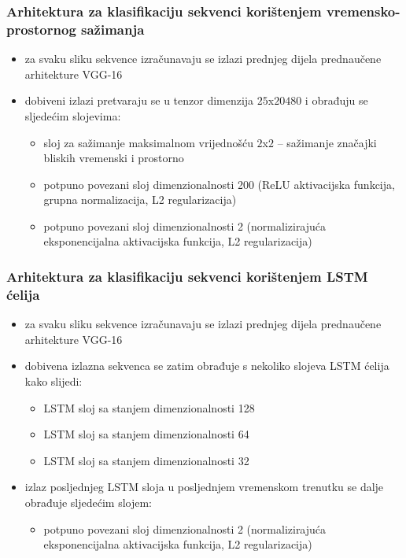 \documentclass{beamer}
\begin{document}
\begin{frame}
\frametitle{Arhitektura za klasifikaciju sekvenci korištenjem vremensko-prostornog sažimanja}
 \begin{itemize}
  \item za svaku sliku sekvence izračunavaju se izlazi prednjeg dijela prednaučene arhitekture VGG-16
  \item dobiveni izlazi pretvaraju se u tenzor dimenzija $25$x$20480$ i obrađuju se sljedećim slojevima:
  \begin{itemize}
  \item sloj za sažimanje maksimalnom vrijednošću $2$x$2$ -- sažimanje značajki bliskih vremenski i prostorno
  \item potpuno povezani sloj dimenzionalnosti 200 (ReLU aktivacijska funkcija, grupna normalizacija, L2 regularizacija)
  \item potpuno povezani sloj dimenzionalnosti 2 (normalizirajuća eksponencijalna aktivacijska funkcija, L2 regularizacija)
 \end{itemize}
 \end{itemize}

\end{frame}

\begin{frame}
\frametitle{Arhitektura za klasifikaciju sekvenci korištenjem LSTM ćelija}
 \begin{itemize}
  \item za svaku sliku sekvence izračunavaju se izlazi prednjeg dijela prednaučene arhitekture VGG-16
  \item dobivena izlazna sekvenca se zatim obrađuje s nekoliko slojeva LSTM ćelija kako slijedi:
  \begin{itemize}
  \item LSTM sloj sa stanjem dimenzionalnosti 128
  \item LSTM sloj sa stanjem dimenzionalnosti 64
  \item LSTM sloj sa stanjem dimenzionalnosti 32
 \end{itemize}
 \item izlaz posljednjeg LSTM sloja u posljednjem vremenskom trenutku se dalje obrađuje sljedećim slojem:
 \begin{itemize}
  \item potpuno povezani sloj dimenzionalnosti 2 (normalizirajuća eksponencijalna aktivacijska funkcija, L2 regularizacija)
 \end{itemize}

 \end{itemize}

\end{frame}
\end{document}
